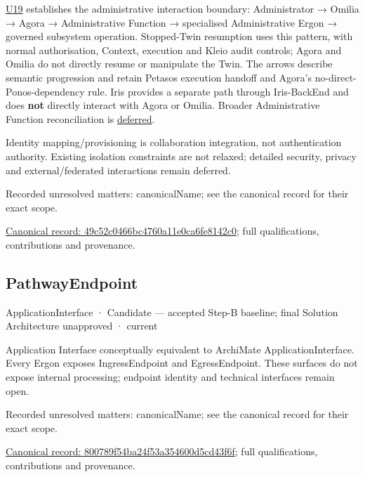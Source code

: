 \href{\detokenize{../../../../../docs/markdown/05-information-systems-architecture/sources.md#u19}}{U19} establishes the administrative interaction boundary:
Administrator → Omilia → Agora → Administrative Function → specialised
Administrative Ergon → governed subsystem operation. Stopped-Twin resumption
uses this pattern, with normal authorisation, Context, execution and Kleio audit
controls; Agora and Omilia do not directly resume or manipulate the Twin.
The arrows describe semantic progression and retain Petasos execution handoff
and Agora's no-direct-Ponos-dependency rule. Iris provides a separate path through
Iris-BackEnd and does \textbf{not} directly interact with Agora or Omilia. Broader
Administrative Function reconciliation is \href{\detokenize{../../../../../docs/markdown/05-information-systems-architecture/gaps.md#administrative-function-finding}}{deferred}.



Identity mapping/provisioning is collaboration integration, not authentication
authority. Existing isolation constraints are not relaxed; detailed security,
privacy and external/federated interactions remain deferred.


{\small Recorded unresolved matters: canonicalName; see the canonical record for their exact scope.}\par
{\footnotesize \href{../../../../continuum/application/application-interface/49c52c0466bc4760a11e0ca6fe8142c0.md}{Canonical record: 49c52c0466bc4760a11e0ca6fe8142c0}; full qualifications, contributions and provenance.}\par
\subsection{PathwayEndpoint}

\label{element:800789f54ba24f53a354600d5cd43f6f}
{\small ApplicationInterface · Candidate — accepted Step-B baseline; final Solution Architecture unapproved · current}\par

Application Interface conceptually equivalent to ArchiMate ApplicationInterface.
Every Ergon exposes IngressEndpoint and EgressEndpoint. These surfaces do not
expose internal processing; endpoint identity and technical interfaces remain open.


{\small Recorded unresolved matters: canonicalName; see the canonical record for their exact scope.}\par
{\footnotesize \href{../../../../continuum/application/application-interface/800789f54ba24f53a354600d5cd43f6f.md}{Canonical record: 800789f54ba24f53a354600d5cd43f6f}; full qualifications, contributions and provenance.}\par
